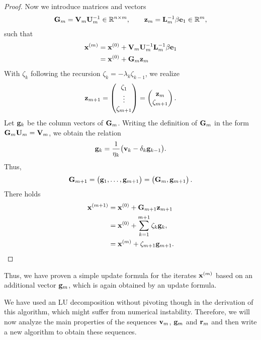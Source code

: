 \begin{proof}
  Now we introduce matrices and vectors
  \begin{gather}
    \mathbf G_m = \mathbf V_m \mathbf U_m^{-1} \in \mathbb R^{n\times m},
    \qquad \mathbf z_m = \mathbf L_m^{-1} \beta \mathbf e_1\in \mathbb R^m,
  \end{gather}
  such that
  \begin{align}
    \mathbf x^{(m)}
    &= \mathbf x^{(0)} + \mathbf V_m \mathbf U_m^{-1} \mathbf L_m^{-1} \beta \mathbf e_1\\
    &= \mathbf x^{(0)} + \mathbf G_m \mathbf z_m
  \end{align}
  With $\zeta_k$ following the recursion
  $\zeta_k = - \lambda_k \zeta_{k-1}$, we realize
  \begin{gather}
    \mathbf z_{m+1} =
    \begin{pmatrix}
      \zeta_1\\\vdots\\\zeta_{m+1}
    \end{pmatrix}
    =
    \begin{pmatrix}
      \mathbf z_{m}\\\zeta_{m+1}
    \end{pmatrix}.
  \end{gather}
  Let $\mathbf g_k$ be the column vectors of $\mathbf G_m$. Writing the
  definition of $\mathbf G_m$ in the form $\mathbf G_m \mathbf U_m = \mathbf V_m$, we
  obtain the relation
  \begin{gather}
    \label{eq:nla:krylov:lanczos-p}
    \mathbf g_k = \frac1{\eta_k}\bigl(\mathbf v_k - \delta_k \mathbf g_{k-1}\bigr).
  \end{gather}
  Thus,
  \begin{gather}
    \mathbf G_{m+1} =
    \begin{pmatrix}
      \mathbf g_1,\dots,\mathbf g_{m+1}
    \end{pmatrix}
    =
    \begin{pmatrix}
      \mathbf G_{m},\mathbf g_{m+1}
    \end{pmatrix}.
  \end{gather}
  There holds
  \begin{align}
    \mathbf x^{(m+1)}
    &= \mathbf x^{(0)} + \mathbf G_{m+1}\mathbf z_{m+1}\\
    &= \mathbf x^{(0)} + \sum_{k=1}^{m+1} \zeta_k \mathbf g_k,\\
    &= \mathbf x^{(m)} + \zeta_{m+1} \mathbf g_{m+1}.
  \end{align}
\end{proof}

\begin{remark}
  Thus, we have proven a simple update formula for the iterates
  $\mathbf x^{(m)}$ based on an additional vector $\mathbf g_m$, which is again
  obtained by an update formula.

  We have used an LU decomposition without pivoting though in the
  derivation of this algorithm, which might suffer from numerical
  instability. Therefore, we will now analyze the main properties of
  the sequences $\mathbf v_m$, $\mathbf g_m$ and $\mathbf r_m$ and then write a new
  algorithm to obtain these sequences.
\end{remark}

